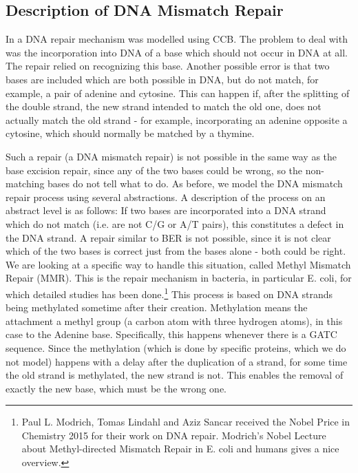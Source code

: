 ﻿
\subsection{Description of DNA Mismatch Repair}

In \cite{10.1007/978-3-319-99498-7_8} a DNA repair mechanism was modelled using CCB. The problem to deal with was the incorporation into DNA of a base which should not occur in DNA at all. The repair relied on recognizing this base. Another possible error is that two bases are included which are both possible in DNA, but do not match, for example, a pair of adenine and cytosine. This can happen if, after the splitting of the double strand, the new strand intended to match the old one, does not actually match the old strand - for example, incorporating an adenine opposite a cytosine, which should normally be matched by a thymine.

Such a repair (a DNA mismatch repair) is not possible in the same way as the base excision repair, since any of the two bases could be wrong, so the non-matching  bases do not tell what to do. As before, we model the DNA mismatch repair process using several abstractions. A description of the process on an abstract level is as follows: If two bases are incorporated into a DNA strand which do not match (i.e. are not C/G or A/T pairs), this constitutes a defect in the DNA strand. A repair similar to BER is not possible, since it is not clear which of the two bases is correct just from the bases alone - both could be right. We are looking at a specific way to handle this situation, called Methyl Mismatch Repair (MMR). This is the repair mechanism in bacteria, in particular E. coli, for which detailed studies has been done.\footnote{Paul L. Modrich, Tomas Lindahl and Aziz Sancar received the Nobel Price in Chemistry 2015 for their work on DNA repair. Modrich's Nobel Lecture about Methyl-directed Mismatch Repair in E. coli and humans \cite{pmid27198632} gives a nice overview.} This process is based on DNA strands being methylated sometime after their creation. Methylation means the attachment a methyl group (a carbon atom with three hydrogen atoms), in this case to the Adenine base. Specifically, this happens whenever there is a GATC sequence. Since the methylation (which is done by specific proteins, which we do not model) happens with a delay after the duplication of a strand, for some time the old strand is methylated, the new strand is not. This enables the removal of exactly the new base, which must be the wrong one.

